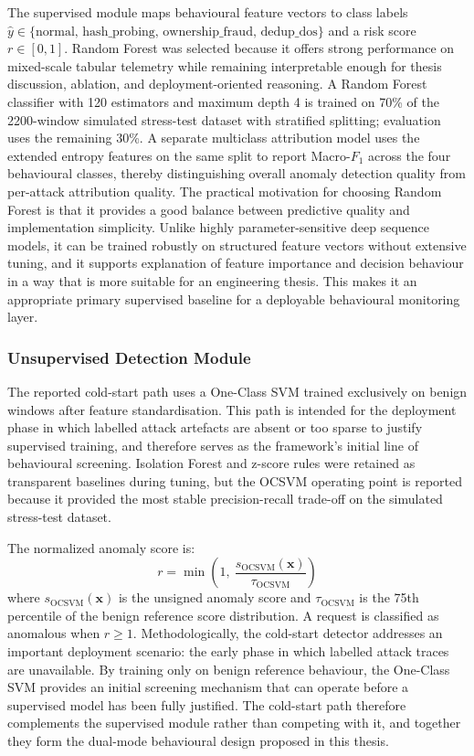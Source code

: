 \documentclass[12pt,a4paper,oneside]{report}
\begin{document}
The supervised module maps behavioural feature vectors to class labels $\hat{y} \in \{\text{normal, hash\_probing, ownership\_fraud, dedup\_dos}\}$ and a risk score $r \in [0,1]$.
Random Forest was selected because it offers strong performance on mixed-scale tabular telemetry while remaining interpretable enough for thesis discussion, ablation, and deployment-oriented reasoning.
A Random Forest classifier with 120 estimators and maximum depth 4 is trained on 70\% of the 2200-window simulated stress-test dataset with stratified splitting; evaluation uses the remaining 30\%.
A separate multiclass attribution model uses the extended entropy features on the same split to report Macro-$F_1$ across the four behavioural classes, thereby distinguishing overall anomaly detection quality from per-attack attribution quality.
The practical motivation for choosing Random Forest is that it provides a good balance between predictive quality and implementation simplicity.
Unlike highly parameter-sensitive deep sequence models, it can be trained robustly on structured feature vectors without extensive tuning, and it supports explanation of feature importance and decision behaviour in a way that is more suitable for an engineering thesis.
This makes it an appropriate primary supervised baseline for a deployable behavioural monitoring layer.

\subsubsection{Unsupervised Detection Module}

The reported cold-start path uses a One-Class SVM trained exclusively on benign windows after feature standardisation.
This path is intended for the deployment phase in which labelled attack artefacts are absent or too sparse to justify supervised training, and therefore serves as the framework's initial line of behavioural screening.
Isolation Forest and z-score rules were retained as transparent baselines during tuning, but the OCSVM operating point is reported because it provided the most stable precision-recall trade-off on the simulated stress-test dataset.

The normalized anomaly score is:
\begin{equation}
  r = \min\!\left(1,\ \frac{s_{\mathrm{OCSVM}}(\mathbf{x})}{\tau_{\mathrm{OCSVM}}}\right)
  \label{eq:unsup}
\end{equation}
where $s_{\mathrm{OCSVM}}(\mathbf{x})$ is the unsigned anomaly score and $\tau_{\mathrm{OCSVM}}$ is the 75th percentile of the benign reference score distribution.
A request is classified as anomalous when $r \geq 1$.
Methodologically, the cold-start detector addresses an important deployment scenario: the early phase in which labelled attack traces are unavailable.
By training only on benign reference behaviour, the One-Class SVM provides an initial screening mechanism that can operate before a supervised model has been fully justified.
The cold-start path therefore complements the supervised module rather than competing with it, and together they form the dual-mode behavioural design proposed in this thesis.
\end{document}
